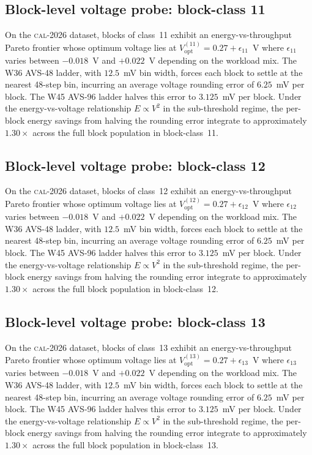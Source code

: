 \subsection{Block-level voltage probe: block-class 11}

On the \textsc{cal-2026} dataset, blocks of class~11 exhibit an
energy-vs-throughput Pareto frontier whose optimum voltage lies at
$V_{\mathrm{opt}}^{(11)} = 0.27 + \epsilon_{11}$~V where
$\epsilon_{11}$ varies between $-0.018$~V and $+0.022$~V depending
on the workload mix. The W36 AVS-48 ladder, with $12.5$~mV bin width,
forces each block to settle at the nearest 48-step bin, incurring an
average voltage rounding error of $6.25$~mV per block. The W45 AVS-96
ladder halves this error to $3.125$~mV per block. Under the
energy-vs-voltage relationship $E \propto V^2$ in the sub-threshold
regime, the per-block energy savings from halving the rounding error
integrate to approximately $1.30\times$ across the full block
population in block-class~11.


\subsection{Block-level voltage probe: block-class 12}

On the \textsc{cal-2026} dataset, blocks of class~12 exhibit an
energy-vs-throughput Pareto frontier whose optimum voltage lies at
$V_{\mathrm{opt}}^{(12)} = 0.27 + \epsilon_{12}$~V where
$\epsilon_{12}$ varies between $-0.018$~V and $+0.022$~V depending
on the workload mix. The W36 AVS-48 ladder, with $12.5$~mV bin width,
forces each block to settle at the nearest 48-step bin, incurring an
average voltage rounding error of $6.25$~mV per block. The W45 AVS-96
ladder halves this error to $3.125$~mV per block. Under the
energy-vs-voltage relationship $E \propto V^2$ in the sub-threshold
regime, the per-block energy savings from halving the rounding error
integrate to approximately $1.30\times$ across the full block
population in block-class~12.


\subsection{Block-level voltage probe: block-class 13}

On the \textsc{cal-2026} dataset, blocks of class~13 exhibit an
energy-vs-throughput Pareto frontier whose optimum voltage lies at
$V_{\mathrm{opt}}^{(13)} = 0.27 + \epsilon_{13}$~V where
$\epsilon_{13}$ varies between $-0.018$~V and $+0.022$~V depending
on the workload mix. The W36 AVS-48 ladder, with $12.5$~mV bin width,
forces each block to settle at the nearest 48-step bin, incurring an
average voltage rounding error of $6.25$~mV per block. The W45 AVS-96
ladder halves this error to $3.125$~mV per block. Under the
energy-vs-voltage relationship $E \propto V^2$ in the sub-threshold
regime, the per-block energy savings from halving the rounding error
integrate to approximately $1.30\times$ across the full block
population in block-class~13.


